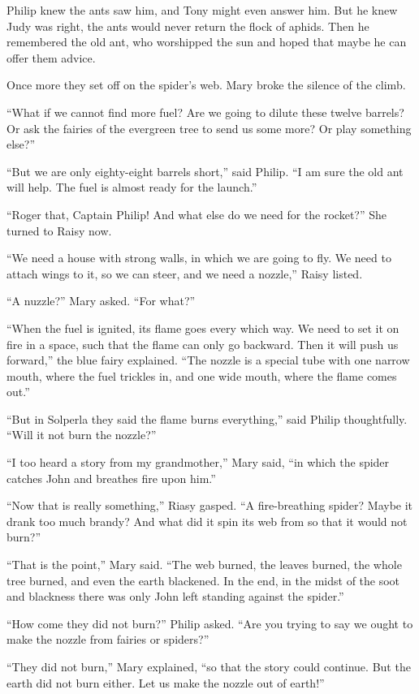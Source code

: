 \documentclass[10pt, draft]{memoir}
\begin{document}
Philip knew the ants saw him, and Tony might even answer him. But he knew Judy
was right, the ants would never return the flock of aphids. Then he remembered
the old ant, who worshipped the sun and hoped that maybe he can offer them
advice.

Once more they set off on the spider's web. Mary broke the silence of the
climb.

``What if we cannot find more fuel? Are we going to dilute these twelve
barrels? Or ask the fairies of the evergreen tree to send us some more? Or play
something else?''

``But we are only eighty-eight barrels short,'' said Philip. ``I am sure the
old ant will help. The fuel is almost ready for the launch.''

``Roger that, Captain Philip! And what else do we need for the rocket?'' She
turned to Raisy now.

``We need a house with strong walls, in which we are going to fly. We need to
attach wings to it, so we can steer, and we need a nozzle,'' Raisy listed.

``A nuzzle?'' Mary asked. ``For what?''

``When the fuel is ignited, its flame goes every which way. We need to set it
on fire in a space, such that the flame can only go backward. Then it will push
us forward,'' the blue fairy explained. ``The nozzle is a special tube with one
narrow mouth, where the fuel trickles in, and one wide mouth, where the flame
comes out.''

``But in Solperla they said the flame burns everything,'' said Philip
thoughtfully. ``Will it not burn the nozzle?''

``I too heard a story from my grandmother,'' Mary said, ``in which the spider
catches John and breathes fire upon him.''

``Now that is really something,'' Riasy gasped. ``A fire-breathing spider?
Maybe it drank too much brandy? And what did it spin its web from so that it
would not burn?''

``That is the point,'' Mary said. ``The web burned, the leaves burned, the
whole tree burned, and even the earth blackened. In the end, in the midst of
the soot and blackness there was only John left standing against the spider.''

``How come they did not burn?'' Philip asked. ``Are you trying to say we ought
to make the nozzle from fairies or spiders?''

``They did not burn,'' Mary explained, ``so that the story could continue. But
the earth did not burn either. Let us make the nozzle out of earth!''
\end{document}
